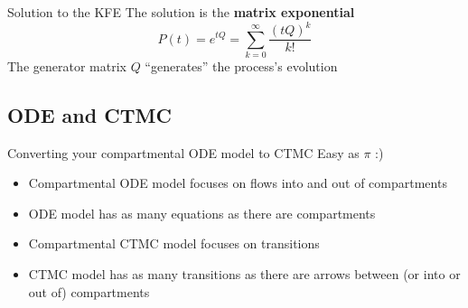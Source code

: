 \documentclass[aspectratio=169]{beamer}
\begin{document}
\begin{frame}{Solution to the KFE}
        The solution is the \textbf{matrix exponential}
        $$ P(t) = e^{tQ} = \sum_{k=0}^{\infty} \frac{(tQ)^k}{k!} $$
        \vfill
        The generator matrix $Q$ ``generates'' the process's evolution
\end{frame}


%     
%     
%     



\subsection{ODE and CTMC}


\begin{frame}{Converting your compartmental ODE model to CTMC}
    Easy as $\pi$ :)
\vfill
\begin{itemize}
    \item Compartmental ODE model focuses on flows into and out of compartments
    \vfill
    \item ODE model has as many equations as there are compartments
    \vfill
    \item Compartmental CTMC model focuses on transitions
    \vfill
    \item CTMC model has as many transitions as there are arrows between (or into or out of) compartments
\end{itemize}
\end{frame}
\end{document}
